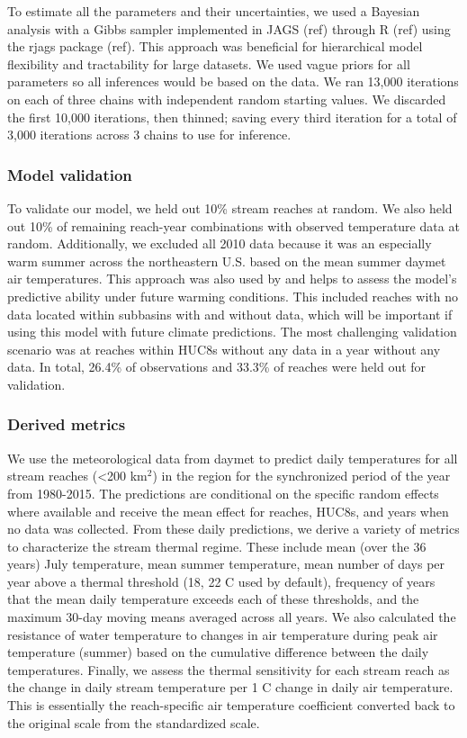\documentclass[]{article}
\begin{document}
To estimate all the parameters and their uncertainties, we used a
Bayesian analysis with a Gibbs sampler implemented in JAGS (ref) through
R (ref) using the rjags package (ref). This approach was beneficial for
hierarchical model flexibility and tractability for large datasets. We
used vague priors for all parameters so all inferences would be based on
the data. We ran 13,000 iterations on each of three chains with
independent random starting values. We discarded the first 10,000
iterations, then thinned; saving every third iteration for a total of
3,000 iterations across 3 chains to use for inference.

\subsubsection{Model validation}\label{model-validation}

To validate our model, we held out 10\% stream reaches at random. We
also held out 10\% of remaining reach-year combinations with observed
temperature data at random. Additionally, we excluded all 2010 data
because it was an especially warm summer across the northeastern U.S.
based on the mean summer daymet air temperatures. This approach was also
used by \citep{DeWeber2014a} and helps to assess the model's predictive
ability under future warming conditions. This included reaches with no
data located within subbasins with and without data, which will be
important if using this model with future climate predictions. The most
challenging validation scenario was at reaches within HUC8s without any
data in a year without any data. In total, 26.4\% of observations and
33.3\% of reaches were held out for validation.

\subsubsection{Derived metrics}\label{derived-metrics}

We use the meteorological data from daymet to predict daily temperatures
for all stream reaches (\textless{}200 km\(^2\)) in the region for the
synchronized period of the year from 1980-2015. The predictions are
conditional on the specific random effects where available and receive
the mean effect for reaches, HUC8s, and years when no data was
collected. From these daily predictions, we derive a variety of metrics
to characterize the stream thermal regime. These include mean (over the
36 years) July temperature, mean summer temperature, mean number of days
per year above a thermal threshold (18, 22 C used by default), frequency
of years that the mean daily temperature exceeds each of these
thresholds, and the maximum 30-day moving means averaged across all
years. We also calculated the resistance of water temperature to changes
in air temperature during peak air temperature (summer) based on the
cumulative difference between the daily temperatures. Finally, we assess
the thermal sensitivity for each stream reach as the change in daily
stream temperature per 1 C change in daily air temperature. This is
essentially the reach-specific air temperature coefficient converted
back to the original scale from the standardized scale.
\end{document}
